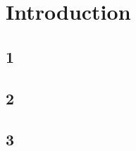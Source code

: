 \tableofcontents
\newpage
\section{Introduction}

\subsection{1}





\subsection{2}





\subsection{3}




\clearpage  %
